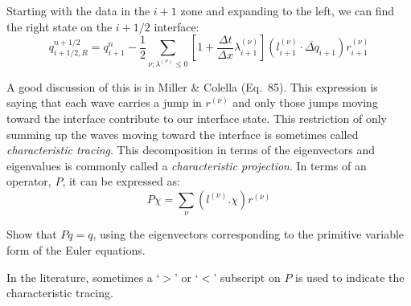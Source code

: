 Starting with the data in the $i+1$ zone and expanding to the left, we can
find the right state on the $i+1/2$ interface:
\begin{equation}
q_{i+1/2,R}^{n+1/2} = q_{i+1}^n - \frac{1}{2} \sum_{\nu; \lambda^{(\nu)} \le 0}
  \left [ 1 + \frac{\Delta t}{\Delta x} \lambda_{i+1}^{(\nu)} \right ] (l_{i+1}^{(\nu)} \cdot \overline{\Delta q}_{i+1}) r_{i+1}^{(\nu)}
\end{equation}


A good discussion of this is in Miller \& Colella
\cite{millercolella:2002} (Eq.\ 85).  This expression is saying that
each wave carries a jump in $r^{(\nu)}$ and only those jumps moving
toward the interface contribute to our interface state.  This
restriction of only summing up the waves moving toward the interface
is sometimes called {\em characteristic tracing}.  This decomposition
in terms of the eigenvectors and eigenvalues is commonly called a {\em
  characteristic projection}.  In terms of an operator, $P$, it can be
expressed as:
\begin{equation}
P \chi = \sum_\nu (l^{(\nu)} . \chi) r^{(\nu)}
\end{equation}
\begin{exercise}
{
Show that $P q = q$, using the eigenvectors corresponding to the primitive
 variable form of the Euler equations.}
\end{exercise}
In the literature, sometimes a `$>$' or `$<$' subscript on $P$ is used
to indicate the characteristic tracing.

